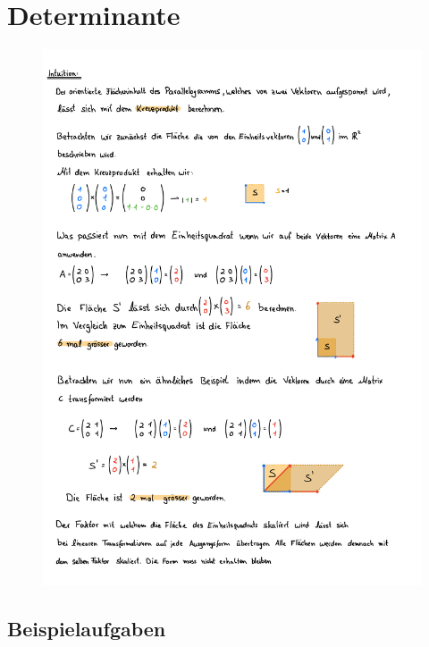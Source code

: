 \section{Determinante}
\begin{figure}[h!]
    \includegraphics[page=1, scale=0.842]{pdf/03_Determinante.pdf}
\end{figure}
\newpage



\subsection{Beispielaufgaben} 

\vspace{1cm}

